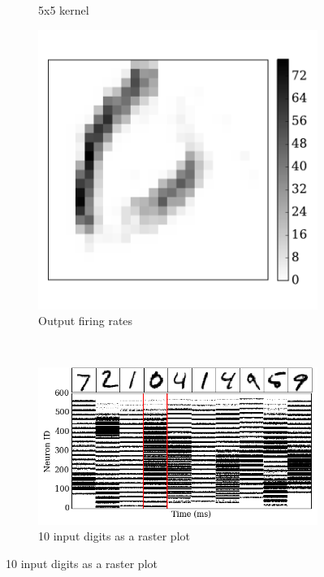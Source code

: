 \begin{figure}[bt!]
\begin{subfigure}[t]{0.3\textwidth}
		    \caption{5x5 kernel}
		    \label{Fig:63}
		\end{subfigure}
		\begin{subfigure}[t]{0.3\textwidth}
			\includegraphics[width=\textwidth]{pics_iconip/6-4.pdf}
		    \caption{Output firing rates}
		    \label{Fig:64}
		\end{subfigure}
		\\
		\begin{subfigure}[t]{0.4\textwidth}
			\includegraphics[width=\textwidth]{pics_iconip/6-1.png}
		    \caption{10 input digits as a raster plot}
		    \label{Fig:61}
		\end{subfigure}

\end{figure}
